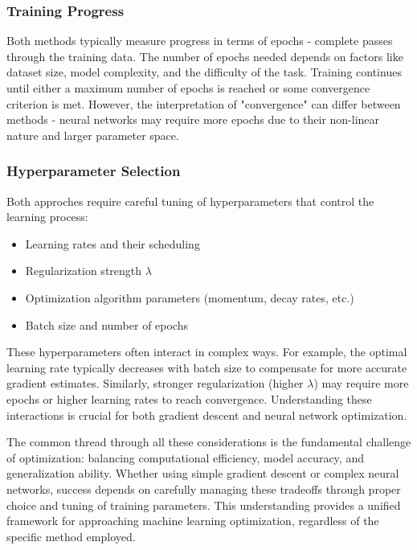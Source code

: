 \documentclass[aps,pra,english,notitlepage,reprint,nofootinbib]{revtex4-1}  %
\begin{document}
\subsubsection{Training Progress}
Both methods typically measure progress in terms of epochs - complete passes through the training data. The number of epochs needed depends on factors like dataset size, model complexity, and the difficulty of the task. Training continues until either a maximum number of epochs is reached or some convergence criterion is met. However, the interpretation of "convergence" can differ between methods - neural networks may require more epochs due to their non-linear nature and larger parameter space.

\subsubsection{Hyperparameter Selection}
Both approches require careful tuning of hyperparameters that control the learning process:
\begin{itemize}
    \item Learning rates and their scheduling
    \item Regularization strength \( \lambda \)
    \item Optimization algorithm parameters (momentum, decay rates, etc.)
    \item Batch size and number of epochs
\end{itemize}

These hyperparameters often interact in complex ways. For example, the optimal learning rate typically decreases with batch size to compensate for more accurate gradient estimates. Similarly, stronger regularization (higher \( \lambda \)) may require more epochs or higher learning rates to reach convergence. Understanding these interactions is crucial for both gradient descent and neural network optimization.

The common thread through all these considerations is the fundamental challenge of optimization: balancing computational efficiency, model accuracy, and generalization ability. Whether using simple gradient descent or complex neural networks, success depends on carefully managing these tradeoffs through proper choice and tuning of training parameters. This understanding provides a unified framework for approaching machine learning optimization, regardless of the specific method employed.
\end{document}
